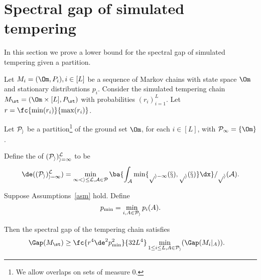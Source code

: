 \section{Spectral gap of simulated tempering}
\label{s:main}

In this section we prove a lower bound for the spectral gap of simulated tempering given a partition.

\begin{asm}\label{asm}
Let $M_i=(\Om, P_i), i\in [L]$ be a sequence of Markov chains with state space $\Om$ and stationary distributions $p_i$.
Consider the simulated tempering chain $M_{\st}=(\Om\times[L], P_{\st})$ %
 with probabilities $(r_i)_{i=1}^{L}$. Let $r = \fc{\min(r_i)}{\max(r_i)}$.  

Let $\cal P_i$
be a partition\footnote{We allow overlaps on sets of measure 0.} of the ground set $\Om$, for each $i\in [L]$, with $\cal P_1=\{\Om\}$. 

Define the  of $(\cal P_i)_{i=1}^L$ to be 
$$
\de((\cal P_i)_{i=1}^L) = \min_{1< i\le L, A\in \cal P} \ba{
\int_{A} \min\{p_{i-1}(x),p_i(x)\} \dx 
}/p_i(A).
$$
\end{asm}

\begin{thm}
Suppose Assumptions~\ref{asm} hold. Define
$$
p_{\min}=\min_{i,A\in \cal P_i} p_i(A). 
$$

Then the spectral gap of the tempering chain satisfies
\begin{align}
\Gap(M_{\st}) &\ge\fc{r^4\de^2p_{\min}^2}{32L^4}
\min_{1\le i\le L, A\in \cal P_i} (\Gap(M_{i}|_A)).
\end{align} 
\label{t:temperingnochain}
\end{thm} 


